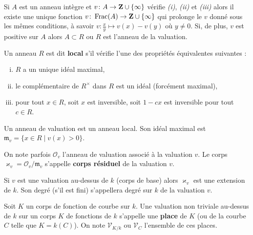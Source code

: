 	\begin{rem}
		Si $A$ est un anneau intègre et $v \colon A \to \mathbf{Z} \cup \{ \infty \}$ vérifie \textit{(i)}, \textit{(ii)} et \textit{(iii)} alors il existe une unique fonction $v \colon \operatorname{Frac}(A) \to \mathbf{Z} \cup \{ \infty \}$ qui prolonge le $v$ donné sous les mêmes conditions, à savoir $v \colon \frac{x}{y} \mapsto v(x) - v(y)$ où $y \neq 0$.
		Si, de plus, $v$ est positive sur $A$ alors $A \subset R$ ou $R$ est l'anneau de la valuation.
	\end{rem}

	\begin{defn}
		Un anneau $R$ est dit \textbf{local} s'il vérifie l'une des propriétés équivalentes suivantes :
		\begin{enumerate}[(i)]
			\item $R$ a un unique idéal maximal,
			\item le complémentaire de $R^\times$ dans $R$ est un idéal (forcément maximal),
			\item pour tout $x \in R$, soit $x$ est inversible, soit $1 - cx$ est inversible pour tout $c \in R$.
		\end{enumerate}
	\end{defn}
	
	\begin{pop}
		Un anneau de valuation est un anneau local.
		Son idéal maximal est $\mathfrak{m}_v = \{ x \in R \mid v(x) > 0 \}$.
	\end{pop}
	
	\begin{defn}
		On note parfois $\mathcal{O}_v$ l'anneau de valuation associé à la valuation $v$.
		Le corps $\varkappa_v = \mathcal{O}_v / \mathfrak{m}_v$ s'appelle \textbf{corps résiduel} de la valuation $v$.
	\end{defn}

	\begin{pop}
		Si $v$ est une valuation au-dessus de $k$ (corps de base) alors $\varkappa_v$ est une extension de $k$.
		Son degré (s'il est fini) s'appellera degré sur $k$ de la valuation $v$.
	\end{pop}

	\begin{defn}
		Soit $K$ un corps de fonction de courbe sur $k$.
		Une valuation non triviale au-dessus de $k$ sur un corps $K$ de fonctions de $k$ s'appelle une \textbf{place} de $K$ (ou de la courbe $C$ telle que $K = k(C)$).
		On note $\mathscr{V}_{K/k}$ ou $\mathscr{V}_C$ l'ensemble de ces places.
	\end{defn}

